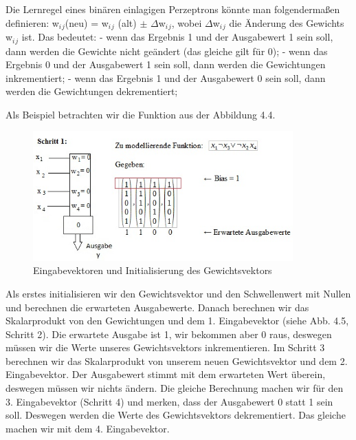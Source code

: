 Die Lernregel eines binären einlagigen Perzeptrons könnte man folgendermaßen definieren:
\newline
w$_i$$_j$(neu) = w$_i$$_j$ (alt) $\pm$ $\Delta$w$_i$$_j$,
\newline wobei $\Delta$w$_i$$_j$ die Änderung des Gewichts w$_i$$_j$ ist. Das bedeutet:
\newline
- wenn das Ergebnis 1 und der Ausgabewert 1 sein soll, dann werden die Gewichte nicht geändert (das gleiche gilt für 0);
\newline
- wenn das Ergebnis 0 und der Ausgabewert 1 sein soll, dann werden die Gewichtungen inkrementiert;
\newline
- wenn das Ergebnis 1 und der Ausgabewert 0 sein soll, dann werden die Gewichtungen dekrementiert;

Als Beispiel betrachten wir die Funktion aus der Abbildung 4.4.

\begin{figure}[h]
\centering
\includegraphics[width=10cm]{chapters/neural_networks/schritt1.jpg}

\caption{Eingabevektoren und Initialisierung des Gewichtsvektors}

\end{figure}

Als erstes initialisieren wir den Gewichtsvektor und den Schwellenwert mit Nullen und berechnen die erwarteten Ausgabewerte. Danach berechnen wir das Skalarprodukt von den Gewichtungen und dem 1. Eingabevektor (siehe Abb. 4.5, Schritt 2). Die erwartete Ausgabe ist 1, wir bekommen aber 0 raus, deswegen müssen wir die Werte unseres Gewichtsvektors inkrementieren. Im Schritt 3 berechnen wir das Skalarprodukt von unserem neuen Gewichtsvektor und dem 2. Eingabevektor. Der Ausgabewert stimmt mit dem erwarteten Wert überein, deswegen müssen wir nichts ändern. Die gleiche Berechnung machen wir für den 3. Eingabevektor (Schritt 4) und merken, dass der Ausgabewert 0 statt 1 sein soll. Deswegen werden  die Werte des Gewichtsvektors dekrementiert. Das gleiche machen wir mit dem 4. Eingabevektor.

